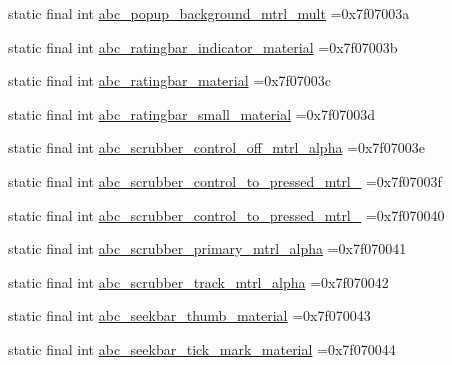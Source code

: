 \begin{DoxyCompactItemize}
\item 
static final int \mbox{\hyperlink{classbr_1_1unb_1_1cic_1_1mp_1_1marketmaster_1_1test_1_1R_1_1drawable_a85b954b213ab2c500286e52882ea9cff}{abc\+\_\+popup\+\_\+background\+\_\+mtrl\+\_\+mult}} =0x7f07003a
\item 
static final int \mbox{\hyperlink{classbr_1_1unb_1_1cic_1_1mp_1_1marketmaster_1_1test_1_1R_1_1drawable_aeffbb861e1c2b007aab569120f455c56}{abc\+\_\+ratingbar\+\_\+indicator\+\_\+material}} =0x7f07003b
\item 
static final int \mbox{\hyperlink{classbr_1_1unb_1_1cic_1_1mp_1_1marketmaster_1_1test_1_1R_1_1drawable_a4510da94191d3d3ee6be176704a1128c}{abc\+\_\+ratingbar\+\_\+material}} =0x7f07003c
\item 
static final int \mbox{\hyperlink{classbr_1_1unb_1_1cic_1_1mp_1_1marketmaster_1_1test_1_1R_1_1drawable_aa67db9c0f63da463fe8c7796975a0a28}{abc\+\_\+ratingbar\+\_\+small\+\_\+material}} =0x7f07003d
\item 
static final int \mbox{\hyperlink{classbr_1_1unb_1_1cic_1_1mp_1_1marketmaster_1_1test_1_1R_1_1drawable_a38896651d32d6d6fd6e72686bd0ef6a0}{abc\+\_\+scrubber\+\_\+control\+\_\+off\+\_\+mtrl\+\_\+alpha}} =0x7f07003e
\item 
static final int \mbox{\hyperlink{classbr_1_1unb_1_1cic_1_1mp_1_1marketmaster_1_1test_1_1R_1_1drawable_a052e2f0e4844cac1d8e80e39f7aa08bc}{abc\+\_\+scrubber\+\_\+control\+\_\+to\+\_\+pressed\+\_\+mtrl\+\_}} =0x7f07003f
\item 
static final int \mbox{\hyperlink{classbr_1_1unb_1_1cic_1_1mp_1_1marketmaster_1_1test_1_1R_1_1drawable_ac1f3af7676e5253e6f3f7d8a2bddb681}{abc\+\_\+scrubber\+\_\+control\+\_\+to\+\_\+pressed\+\_\+mtrl\+\_}} =0x7f070040
\item 
static final int \mbox{\hyperlink{classbr_1_1unb_1_1cic_1_1mp_1_1marketmaster_1_1test_1_1R_1_1drawable_a1a2cec3763f31087d3172865d875c4fe}{abc\+\_\+scrubber\+\_\+primary\+\_\+mtrl\+\_\+alpha}} =0x7f070041
\item 
static final int \mbox{\hyperlink{classbr_1_1unb_1_1cic_1_1mp_1_1marketmaster_1_1test_1_1R_1_1drawable_a3a68a5a01cebc66a2c644dfd56995d88}{abc\+\_\+scrubber\+\_\+track\+\_\+mtrl\+\_\+alpha}} =0x7f070042
\item 
static final int \mbox{\hyperlink{classbr_1_1unb_1_1cic_1_1mp_1_1marketmaster_1_1test_1_1R_1_1drawable_a19a9096385ce8a67d6c439735f5fa0fa}{abc\+\_\+seekbar\+\_\+thumb\+\_\+material}} =0x7f070043
\item 
static final int \mbox{\hyperlink{classbr_1_1unb_1_1cic_1_1mp_1_1marketmaster_1_1test_1_1R_1_1drawable_ace18c190cf5f9274c6b2f438d2ea3ff5}{abc\+\_\+seekbar\+\_\+tick\+\_\+mark\+\_\+material}} =0x7f070044

\end{DoxyCompactItemize}
